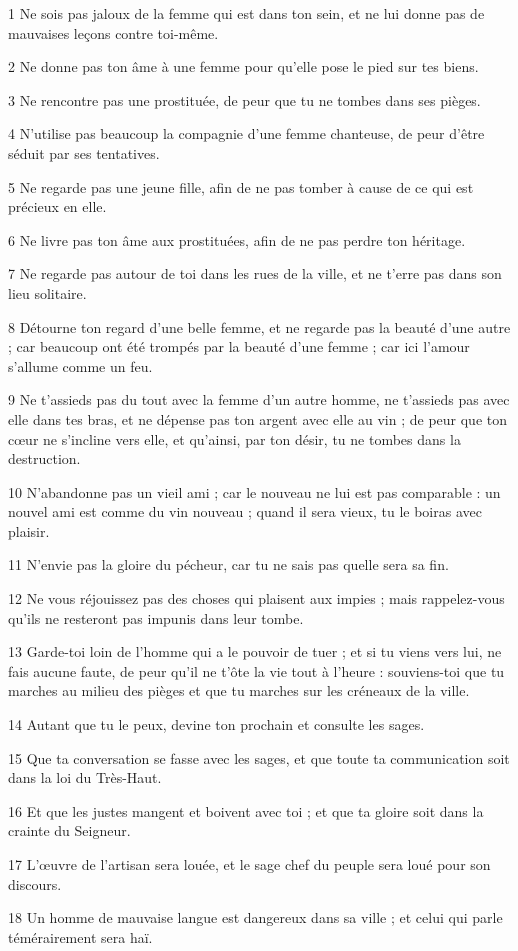 
\par 1 Ne sois pas jaloux de la femme qui est dans ton sein, et ne lui donne pas de mauvaises leçons contre toi-même.
\par 2 Ne donne pas ton âme à une femme pour qu'elle pose le pied sur tes biens.
\par 3 Ne rencontre pas une prostituée, de peur que tu ne tombes dans ses pièges.
\par 4 N'utilise pas beaucoup la compagnie d'une femme chanteuse, de peur d'être séduit par ses tentatives.
\par 5 Ne regarde pas une jeune fille, afin de ne pas tomber à cause de ce qui est précieux en elle.
\par 6 Ne livre pas ton âme aux prostituées, afin de ne pas perdre ton héritage.
\par 7 Ne regarde pas autour de toi dans les rues de la ville, et ne t'erre pas dans son lieu solitaire.
\par 8 Détourne ton regard d'une belle femme, et ne regarde pas la beauté d'une autre ; car beaucoup ont été trompés par la beauté d’une femme ; car ici l'amour s'allume comme un feu.
\par 9 Ne t'assieds pas du tout avec la femme d'un autre homme, ne t'assieds pas avec elle dans tes bras, et ne dépense pas ton argent avec elle au vin ; de peur que ton cœur ne s'incline vers elle, et qu'ainsi, par ton désir, tu ne tombes dans la destruction.
\par 10 N'abandonne pas un vieil ami ; car le nouveau ne lui est pas comparable : un nouvel ami est comme du vin nouveau ; quand il sera vieux, tu le boiras avec plaisir.
\par 11 N'envie pas la gloire du pécheur, car tu ne sais pas quelle sera sa fin.
\par 12 Ne vous réjouissez pas des choses qui plaisent aux impies ; mais rappelez-vous qu'ils ne resteront pas impunis dans leur tombe.
\par 13 Garde-toi loin de l'homme qui a le pouvoir de tuer ; et si tu viens vers lui, ne fais aucune faute, de peur qu'il ne t'ôte la vie tout à l'heure : souviens-toi que tu marches au milieu des pièges et que tu marches sur les créneaux de la ville.
\par 14 Autant que tu le peux, devine ton prochain et consulte les sages.
\par 15 Que ta conversation se fasse avec les sages, et que toute ta communication soit dans la loi du Très-Haut.
\par 16 Et que les justes mangent et boivent avec toi ; et que ta gloire soit dans la crainte du Seigneur.
\par 17 L'œuvre de l'artisan sera louée, et le sage chef du peuple sera loué pour son discours.
\par 18 Un homme de mauvaise langue est dangereux dans sa ville ; et celui qui parle témérairement sera haï.


